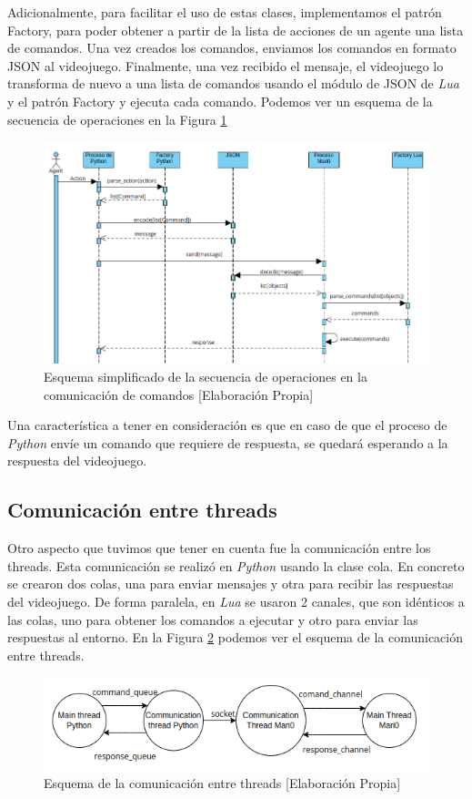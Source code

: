 Adicionalmente, para facilitar el uso de estas clases, implementamos el patrón Factory, para poder obtener a partir de la lista de acciones de un agente una lista de comandos. Una vez creados los comandos, enviamos los comandos en formato JSON al videojuego. Finalmente, una vez recibido el mensaje, el videojuego lo transforma de nuevo a una lista de comandos usando el módulo de JSON de \textit{Lua} y el patrón Factory y ejecuta cada comando. Podemos ver un esquema de la secuencia de operaciones en la Figura \ref {fig:operations}
\begin{figure}[ht]
    \centering
    \includegraphics[width=1.0\textwidth]{img/secuencia_op.png}
    \caption{Esquema simplificado de la secuencia de operaciones en la comunicación de comandos [Elaboración Propia]}
    \label{fig:operations}
\end{figure}

Una característica a tener en consideración es que en caso de que el proceso de \textit{Python} envíe un comando que requiere de respuesta, se quedará esperando a la respuesta del videojuego.

\subsection{Comunicación entre threads}

Otro aspecto que tuvimos que tener en cuenta fue la comunicación entre los threads. Esta comunicación se realizó en \textit{Python} usando la clase cola. En concreto se crearon dos colas, una para enviar mensajes y otra para recibir las respuestas del videojuego. De forma paralela, en \textit{Lua} se usaron 2 canales, que son idénticos a las colas, uno para obtener los comandos a ejecutar y otro para enviar las respuestas al entorno. En la Figura \ref {fig:threads} podemos ver el esquema de la comunicación entre threads. 
\begin{figure}[ht]
    \centering
    \includegraphics[width=1.0\textwidth]{img/threads.png}
    \caption{Esquema de la comunicación entre threads [Elaboración Propia]}
    \label{fig:threads}
\end{figure}


